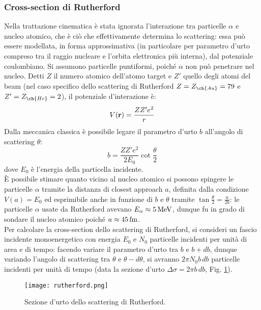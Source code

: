 \subsubsection{Cross-section di Rutherford}

Nella trattazione cinematica è stata ignorata l'interazione tra particelle $ \alpha $ e nucleo atomico, che è ciò che effettivamente determina lo scattering: essa può essere modellata, in forma approssimativa (in particolare per parametro d'urto compreso tra il raggio nucleare e l'orbita elettronica più interna), dal potenziale coulombiano. Si assumono particelle puntiformi, poiché $\alpha$ non può penetrare nel nucleo. Detti $ Z $ il numero atomico dell'atomo target e $ Z' $ quello degli atomi del beam (nel caso specifico dello scattering di Rutherford $ Z = Z_{\ch{Au}} = 79 $ e $ Z' = Z_{\ch{He}} = 2 $), il potenziale d'interazione è:
\begin{equation}
	V(\mathbf{r}) = \frac{ZZ' e^2}{r}
	\label{eq:4}
\end{equation}
Dalla meccanica classica è possibile legare il parametro d'urto $ b $ all'angolo di scattering $ \theta $:
\begin{equation}
	b = \frac{ZZ' e^2}{2 E_0} \cot \frac{\theta}{2}
	\label{eq:5}
\end{equation}
dove $ E_0 $ è l'energia della particella incidente.\\
È possibile stimare quanto vicino al nucleo atomico si possono spingere le particelle $ \alpha $ tramite la distanza di closest approach $ a $, definita dalla condizione $ V(a) = E_0 $ ed esprimibile anche in funzione di $ b $ e $ \theta $ tramite $ \tan \frac{\theta}{2} = \frac{a}{2b} $: le particelle $ \alpha $ usate da Rutherford avevano $ E_{\alpha} \approx 5\,\mathrm{MeV} $, dunque fu in grado di sondare il nucleo atomico poiché $ a \approx 45\,\mathrm{fm} $.\\
Per calcolare la cross-section dello scattering di Rutherford, si consideri un fascio incidente monoenergetico con energia $ E_0 $ e $ N_0 $ particelle incidenti per unità di area e di tempo: facendo variare il parametro d'urto tra $ b $ e $ b + db $, dunque variando l'angolo di scattering tra $ \theta $ e $ \theta - d \theta $, si avranno $ 2\pi N_0 b \,db $ particelle incidenti per unità di tempo (data la sezione d'urto $ \Delta\sigma = 2\pi b \,db $, Fig. \ref{rutherford}).
\begin{figure}
	\centering
	\texttt{[image: rutherford.png]}
	\caption{Sezione d'urto dello scattering di Rutherford.}
	\label{rutherford}
\end{figure}

